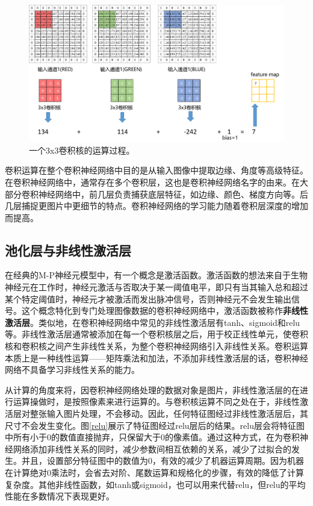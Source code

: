 \begin{figure}[ht]
	\centering
	\includegraphics[width=1\textwidth]{figures/convOPS.png}
	\caption{一个3x3卷积核的运算过程。}
	\label{convOPS}
\end{figure}

卷积运算在整个卷积神经网络中目的是从输入图像中提取边缘、角度等高级特征。在卷积神经网络中，通常存在多个卷积层，这也是卷积神经网络名字的由来。在大部分卷积神经网络中，前几层负责捕获底层特征，如边缘、颜色、梯度方向等。后几层捕捉更图片中更细节的特点。卷积神经网络的学习能力随着卷积层深度的增加而提高。

\subsection{池化层与非线性激活层}
在经典的M-P神经元模型中，有一个概念是激活函数。激活函数的想法来自于生物神经元在工作时，神经元激活与否取决于某一阈值电平，即只有当其输入总和超过某个特定阈值时，神经元才被激活而发出脉冲信号，否则神经元不会发生输出信号。这个概念特化到专门处理图像数据的卷积神经网络中，激活函数被称作\textbf{非线性激活层}。类似地，在卷积神经网络中常见的非线性激活层有tanh、sigmoid和relu等。非线性激活层通常被添加在每一个卷积核层之后，用于校正线性单元，使卷积核和卷积核之间产生非线性关系，为整个卷积神经网络引入非线性关系。卷积运算本质上是一种线性运算——矩阵乘法和加法，不添加非线性激活层的话，卷积神经网络不具备学习非线性关系的能力。

从计算的角度来将，因卷积神经网络处理的数据对象是图片，非线性激活层的在进行运算操做时，是按照像素来进行运算的。与卷积核运算不同之处在于，非线性激活层对整张输入图片处理，不会移动。因此，任何特征图经过非线性激活层后，其尺寸不会发生变化。图\ref{relu}展示了特征图经过relu层后的结果。relu层会将特征图中所有小于0的数值直接抛弃，只保留大于0的像素值。通过这种方式，在为卷积神经网络添加非线性关系的同时，减少参数间相互依赖的关系，减少了过拟合的发生。并且，设置部分特征图中的数值为0，有效的减少了机器运算周期。因为机器在计算绝对0乘法时，会省去对阶、尾数运算和规格化的步骤，有效的降低了计算复杂度。其他非线性函数，如tanh或sigmoid，也可以用来代替relu，但relu的平均性能在多数情况下表现更好。

